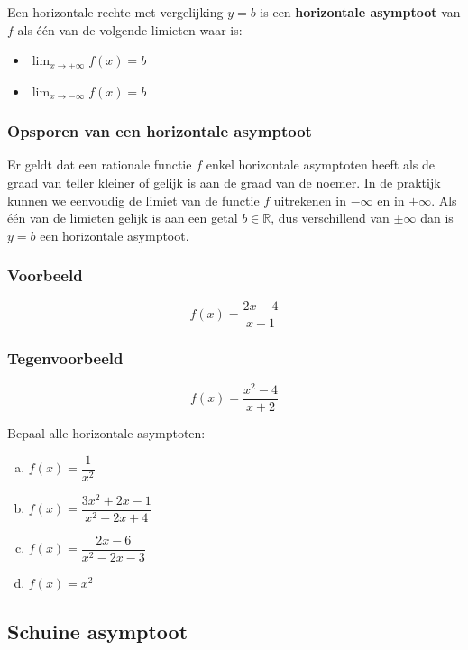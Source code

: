 \documentclass[12pt,twoside,a4paper]{article}
\newenvironment{definitie}
{
  \vspace{0.4cm}
  \begin{mdframed}[nobreak=true,frametitle={Definitie}]
  }{%
  \end{mdframed}
}
\begin{document}
\needspace{2cm}
\begin{definitie}
Een horizontale rechte met vergelijking $y=b$ is een {\bf horizontale asymptoot} van $f$ als één van de volgende limieten waar is:
\begin{multicols}{2}
\begin{itemize}
  \item $\lim_{x\to+\infty} f(x)=b$
  \item $\lim_{x\to-\infty} f(x)=b$
\end{itemize}
\end{multicols}
\end{definitie}

\subsubsection*{Opsporen van een horizontale asymptoot}

Er geldt dat een rationale functie $f$ enkel horizontale asymptoten heeft als de graad van teller kleiner of gelijk is aan de graad van de noemer. In de praktijk kunnen we eenvoudig de limiet van de functie $f$ uitrekenen in $-\infty$ en in $+\infty$. Als één van de limieten gelijk is aan een getal $b\in\mathbb{R}$, dus verschillend van $\pm\infty$ dan is $y=b$ een horizontale asymptoot.

\subsubsection*{Voorbeeld}
$$f(x)=\dfrac{2x-4}{x-1}$$

\subsubsection*{Tegenvoorbeeld}
$$f(x)=\dfrac{x^2-4}{x+2}$$

\begin{oefening}
Bepaal alle horizontale asymptoten:
\begin{enumerate}[(a)]
  \itemsep.5em
  \item $f(x)=\dfrac{1}{x^2}$
  \item $f(x)=\dfrac{3x^2+2x-1}{x^2-2x+4}$
  \item $f(x)=\dfrac{2x-6}{x^2-2x-3}$
  \item $f(x)=x^2$
\end{enumerate}
\end{oefening}

\subsection{Schuine asymptoot}
\end{document}
